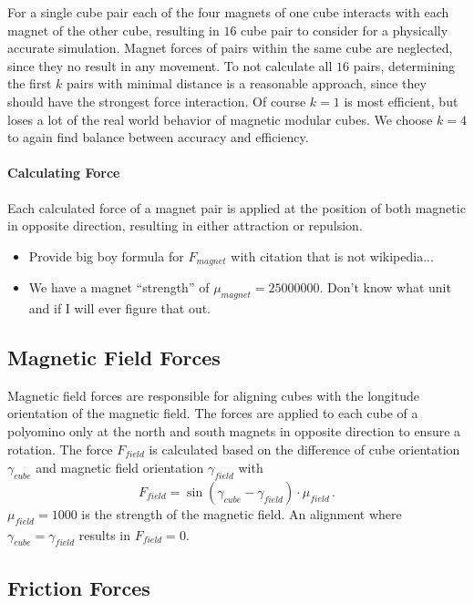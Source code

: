 For a single cube pair each of the four magnets of one cube interacts with each magnet of the other cube, resulting in $16$ cube pair to consider for a physically accurate simulation.
Magnet forces of pairs within the same cube are neglected, since they no result in any movement.
To not calculate all $16$ pairs, determining the first $k$ pairs with minimal distance is a reasonable approach, since they should have the strongest force interaction.
Of course $k=1$ is most efficient, but loses a lot of the real world behavior of magnetic modular cubes.
We choose $k=4$ to again find balance between accuracy and efficiency.

\paragraph{Calculating Force}

Each calculated force of a magnet pair is applied at the position of both magnetic in opposite direction, resulting in either attraction or repulsion.

\begin{itemize}
	\item Provide big boy formula for $F_\textit{magnet}$ with citation that is not wikipedia...
	\item We have a magnet ``strength'' of  $\mu_\textit{magnet} = 25000000$. Don't know what unit and if I will ever figure that out.
\end{itemize}

\subsection{Magnetic Field Forces}
\label{sec:force_field}

Magnetic field forces are responsible for aligning cubes with the longitude orientation of the magnetic field.
The forces are applied to each cube of a polyomino only at the north and south magnets in opposite direction to ensure a rotation.
The force $F_\textit{field}$ is calculated based on the difference of cube orientation $\gamma_\textit{cube}$ and magnetic field orientation $\gamma_\textit{field}$ with
\begin{equation}
F_\textit{field} = \sin(\gamma_\textit{cube} - \gamma_\textit{field}) \cdot \mu_\textit{field} \, .
\end{equation}
$\mu_\textit{field} = 1000$ is the strength of the magnetic field.
An alignment where $\gamma_\textit{cube} = \gamma_\textit{field}$ results in $F_\textit{field} = 0$.


\subsection{Friction Forces}
\label{sec:force_friction}



